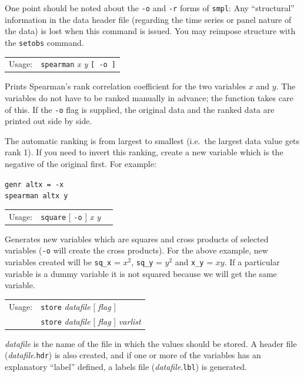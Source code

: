 \documentclass{article}
\begin{document}
{One point should be noted about the \texttt{-o} and \texttt{-r} forms
of \texttt{smpl}:  Any ``structural'' information in the
data header file (regarding the time series or panel nature of the
data) is lost when this command is issued.  You may reimpose structure
with the \texttt{setobs} command.


\begin{tabular}{ll}
Usage:   &       \texttt{spearman} \textit{x y} \texttt{[ -o ]}
\end{tabular}

Prints Spearman's rank correlation coefficient for the two variables
$x$ and $y$.  The variables do not have to be ranked manually in
advance; the function takes care of this.  If the \texttt{-o} flag is
supplied, the original data and the ranked data are printed out side
by side.

The automatic ranking is from largest to smallest (i.e.\ the largest
data value gets rank 1).  If you need to invert this ranking, create a
new variable which is the negative of the original first.  For
example:

\texttt{genr altx = -x}\\
\texttt{spearman altx y}


\begin{tabular}{lll}
Usage:  &  \texttt{square} [ \texttt{-o} ] \textit{x y} 
\end{tabular}

Generates new variables which are squares and cross products of
selected variables (\texttt{-o} will create the cross products).  For
the above example, new variables created will be \verb+sq_x+ = $x^2$,
\verb+sq_y+ = $y^2$ and \verb+x_y+ = $xy$.  If a particular variable
is a dummy variable it is not squared because we will get the same
variable.  


\begin{tabular}{ll}
Usage: & \texttt{store} \textit{datafile} [ \textit{flag} ] \\
       & \texttt{store} \textit{datafile} [ \textit{flag} ]
         \textit{varlist}  
\end{tabular}

\textit{datafile} is the name of the file in which the values should
be stored. A header file (\textit{datafile}.\texttt{hdr}) is also
created, and if one or more of the variables has an explanatory
``label'' defined, a labels file (\textit{datafile}.\texttt{lbl}) is
generated.

}
\end{document}
